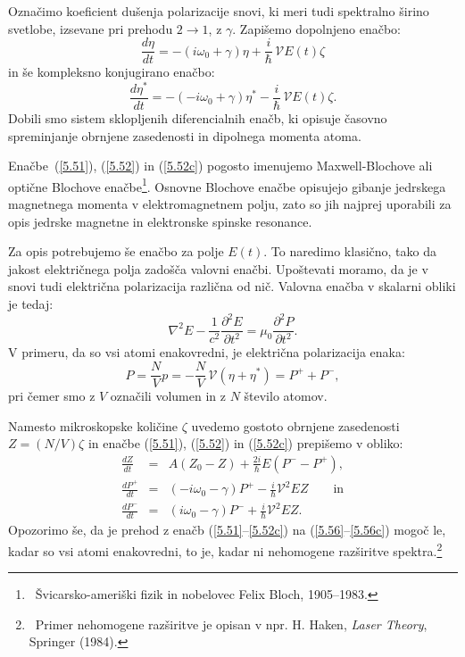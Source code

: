 Označimo
koeficient dušenja polarizacije snovi, ki meri tudi spektralno širino svetlobe, 
izsevane pri prehodu $2\rightarrow 1$, z $\gamma$. Zapišemo
dopolnjeno enačbo:
\begin{equation}  
\label{5.52}
\frac{d\eta}{dt}=- \left(i \omega_0+\gamma\right)\eta+\frac{i}{\hslash}\,\mathcal{V} E(t) \zeta
\end{equation}
in še kompleksno konjugirano enačbo:
\begin{equation}  
\label{5.52c}
\frac{d\eta^*}{dt}=-\left(-i \omega_0+\gamma\right)\eta^*-\frac{i}{\hslash}\,\mathcal{V}E(t) \zeta.
\end{equation}
Dobili smo sistem sklopljenih diferencialnih enačb, ki opisuje časovno
spreminjanje obrnjene zasedenosti in dipolnega momenta atoma. 

\begin{remark}
 Enačbe~(\ref{5.51}), (\ref{5.52}) in (\ref{5.52c}) pogosto imenujemo 
 Maxwell-Blochove ali optične Blochove enačbe\footnote{~Švicarsko-ameriški fizik 
 in nobelovec Felix Bloch, 1905--1983.}. Osnovne Blochove enačbe opisujejo gibanje 
 jedrskega magnetnega  momenta v elektromagnetnem polju, zato so jih najprej uporabili za opis 
 jedrske magnetne in elektronske spinske resonance. 
\end{remark}

Za opis potrebujemo še enačbo za polje $E(t)$. To naredimo klasično, tako da
jakost električnega polja zadošča valovni enačbi. Upoštevati moramo, 
da je v snovi tudi električna polarizacija različna od nič. 
Valovna enačba v skalarni obliki je tedaj:
\begin{equation}  
\label{5.54}
\nabla^2 E-\frac{1}{c^2}\frac{\partial^2 E}{\partial t^2}=\mu_0 \frac{\partial^2 P}{\partial t^2}.
\end{equation}
V primeru, da so vsi atomi enakovredni, je električna polarizacija enaka:
\begin{equation}  
\label{5.53}
P=\frac{N}{V}p = -\frac{N}{V}\,\mathcal{V}\left(\eta+\eta^{\ast}\right)=P^+ + P^-,
\end{equation}
pri čemer smo z $V$ označili volumen in z $N$ število atomov.

Namesto mikroskopske količine $\zeta$ uvedemo gostoto obrnjene
zasedenosti $Z=(N/V)\zeta$ in enačbe (\ref{5.51}), (\ref{5.52}) in (\ref{5.52c})
prepišemo v obliko:
\begin{eqnarray}
\frac{dZ}{dt} &=& A\left(Z_0-Z\right)+\frac{2i}{\hslash}E\left(P^- - P^+\right)\!\!, \label{5.56} \\
\frac{dP^+}{dt}&=&\left(-i \omega_0-\gamma\right)P^{+}-\frac{i}{\hslash} \mathcal{V}^2 E  Z \qquad 
\mathrm{in} \label{5.56b}\\
\frac{dP^-}{dt}&=&\left(i \omega_0-\gamma\right)P^{-}+\frac{i}{\hslash} \mathcal{V}^2 E  Z.\label{5.56c} 
\end{eqnarray}
Opozorimo še, da je prehod z enačb (\ref{5.51}--\ref{5.52c}) na (\ref{5.56}--\ref{5.56c}) 
mogoč le, kadar so vsi atomi enakovredni, to je, kadar ni nehomogene razširitve 
spektra.\footnote{~Primer nehomogene razširitve je opisan v npr.  
H. Haken, {\it Laser Theory}, Springer (1984).}
\newpage

